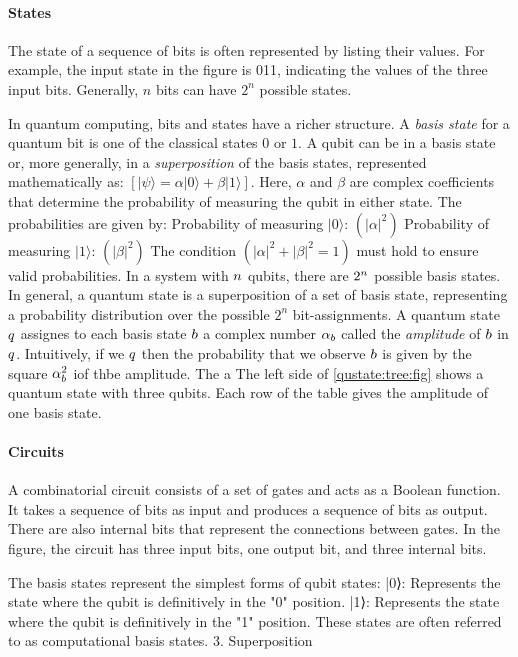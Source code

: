 \paragraph{States}
The state of a sequence of bits is often represented by listing their values. For example, the input state in the figure is 011, indicating the values of the three input bits. Generally, $n$ bits can have $2^n$ possible states. 
%

In quantum computing, bits and states have a richer structure.
%
A {\it basis state} for a quantum bit is one of the classical states $0$ or $1$.
%
A qubit can be in a basis state or, more generally, in a {\it superposition} of the basis states, represented mathematically as: $[|\psi⟩ = \alpha |0⟩ + \beta |1⟩ ]$.
Here, $\alpha$ and $\beta$ are complex coefficients that determine the probability of measuring the qubit in either state.
The probabilities are given by:
Probability of measuring $|0⟩$: $( |\alpha|^2 )$
Probability of measuring $|1⟩$: $( |\beta|^2 )$
The condition $( |\alpha|^2 + |\beta|^2 = 1 )$ must hold to ensure valid probabilities.
%
In a system with $n$ qubits, there are $2^n$ possible basis states.
%
In general, a quantum state is a superposition of a set of basis state, representing a probability distribution over the possible $2^n$ bit-assignments.
%
A quantum state $q$ assignes to each basis state $b$ a complex number $\alpha_b$ called the {\it amplitude} of $b$ in $q$.
%
Intuitively, if we  $q$ then the probability that we observe $b$ is given by the square $\alpha_b^2$ iof thbe amplitude.
%
The a
The left side of \cref{qustate:tree:fig} shows a quantum state with three qubits.
%
Each row of the table gives the amplitude of one basis state.
%


\paragraph{Circuits}
A combinatorial circuit consists of a set of gates and acts as a Boolean function. It takes a sequence of bits as input and produces a sequence of bits as output. There are also internal bits that represent the connections between gates. In the figure, the circuit has three input bits, one output bit, and three internal bits.


The basis states represent the simplest forms of qubit states:
|0⟩: Represents the state where the qubit is definitively in the "0" position.
|1⟩: Represents the state where the qubit is definitively in the "1" position.
These states are often referred to as computational basis states.
3. Superposition

